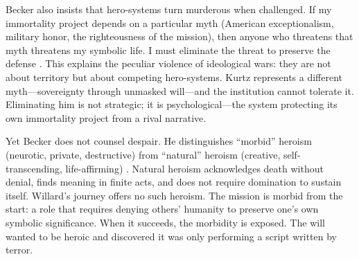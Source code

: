 Becker also insists that hero-systems turn murderous when challenged. If my immortality 
project depends on a particular myth (American exceptionalism, military honor, the righteousness 
of the mission), then anyone who threatens that myth threatens my symbolic life. I must 
eliminate the threat to preserve the defense \parencite[pp.~123--125]{BeckerDenial1973}. This 
explains the peculiar violence of ideological wars: they are not about territory but about 
competing hero-systems. Kurtz represents a different myth---sovereignty through unmasked 
will---and the institution cannot tolerate it. Eliminating him is not strategic; it is 
psychological---the system protecting its own immortality project from a rival narrative.

Yet Becker does not counsel despair. He distinguishes ``morbid'' heroism (neurotic, private, 
destructive) from ``natural'' heroism (creative, self-transcending, life-affirming) 
\parencite[pp.~153--175]{BeckerDenial1973}. Natural heroism acknowledges death without denial, 
finds meaning in finite acts, and does not require domination to sustain itself. Willard's 
journey offers no such heroism. The mission is morbid from the start: a role that requires 
denying others' humanity to preserve one's own symbolic significance. When it succeeds, the 
morbidity is exposed. The will wanted to be heroic and discovered it was only performing a 
script written by terror.

